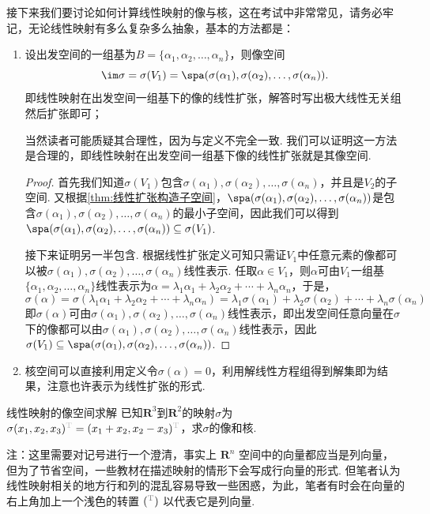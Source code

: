 接下来我们要讨论如何计算线性映射的像与核，这在考试中非常常见，请务必牢记，无论线性映射有多么复杂多么抽象，基本的方法都是：
\begin{enumerate}
    \item 设出发空间的一组基为$B=\{\alpha_1,\alpha_2,\ldots,\alpha_n\}$，则像空间
          \[\im \sigma=\sigma(V_1)=\spa(\sigma(\alpha_1),\sigma(\alpha_2),\ldots,\sigma(\alpha_n)).\]
          即线性映射在出发空间一组基下的像的线性扩张，解答时写出极大线性无关组然后扩张即可；

          当然读者可能质疑其合理性，因为与定义不完全一致. 我们可以证明这一方法是合理的，即线性映射在出发空间一组基下像的线性扩张就是其像空间.

          \begin{proof}
              首先我们知道$\sigma(V_1)$包含$\sigma(\alpha_1),\sigma(\alpha_2),\ldots,\sigma(\alpha_n)$，并且是$V_2$的子空间. 又根据\autoref{thm:线性扩张构造子空间}，$\spa(\sigma(\alpha_1),\sigma(\alpha_2),\ldots,\sigma(\alpha_n))$是包含$\sigma(\alpha_1),\sigma(\alpha_2),\ldots,\sigma(\alpha_n)$的最小子空间，因此我们可以得到$\spa(\sigma(\alpha_1),\sigma(\alpha_2),\ldots,\sigma(\alpha_n))\subseteq\sigma(V_1)$.

              接下来证明另一半包含. 根据线性扩张定义可知只需证$V_1$中任意元素的像都可以被$\sigma(\alpha_1),\sigma(\alpha_2),\ldots,\sigma(\alpha_n)$线性表示. 任取$\alpha\in V_1$，则$\alpha$可由$V_1$一组基$\{\alpha_1,\alpha_2,\ldots,\alpha_n\}$线性表示为$\alpha=\lambda_1\alpha_1+\lambda_2\alpha_2+\cdots+\lambda_n\alpha_n$，于是，
              \[\sigma(\alpha)=\sigma(\lambda_1\alpha_1+\lambda_2\alpha_2+\cdots+\lambda_n\alpha_n)=\lambda_1\sigma(\alpha_1)+\lambda_2\sigma(\alpha_2)+\cdots+\lambda_n\sigma(\alpha_n)\]
              即$\sigma(\alpha)$可由$\sigma(\alpha_1),\sigma(\alpha_2),\ldots,\sigma(\alpha_n)$线性表示，即出发空间任意向量在$\sigma$下的像都可以由$\sigma(\alpha_1),\sigma(\alpha_2),\ldots,\sigma(\alpha_n)$线性表示，因此$\sigma(V_1)\subseteq\spa(\sigma(\alpha_1),\sigma(\alpha_2),\ldots,\sigma(\alpha_n))$.
          \end{proof}

    \item 核空间可以直接利用定义令$\sigma(\alpha)=0$，利用解线性方程组得到解集即为结果，注意也许表示为线性扩张的形式.
\end{enumerate}

\begin{example}{}{线性映射的像空间求解}
    已知$\mathbf{R}^3$到$\mathbf{R}^2$的映射$\sigma$为$\sigma(x_1,x_2,x_3)^{\color{lightgray}\mathrm{T}}=(x_1+x_2,x_2-x_3)^{\color{lightgray}\mathrm{T}}$，求$\sigma$的像和核.
\end{example}
注：这里需要对记号进行一个澄清，事实上 $\mathbf{R}^n$ 空间中的向量都应当是列向量，但为了节省空间，一些教材在描述映射的情形下会写成行向量的形式. 但笔者认为线性映射相关的地方行和列的混乱容易导致一些困惑，为此，笔者有时会在向量的右上角加上一个浅色的转置 $({}^{\color{gray}\mathrm{T}})$ 以代表它是列向量.

